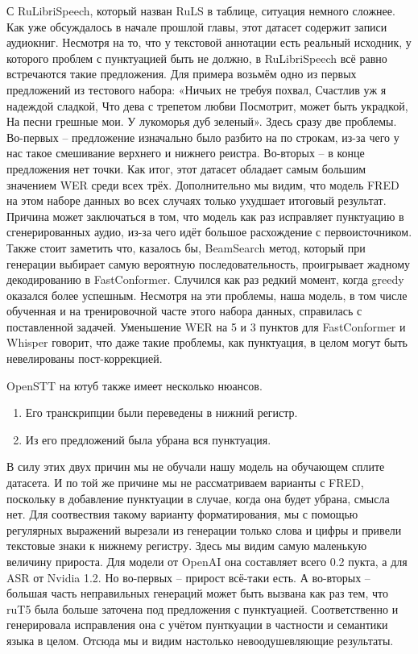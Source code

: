 С RuLibriSpeech, который назван RuLS в таблице, ситуация немного сложнее.
Как уже обсуждалось в начале прошлой главы, этот датасет содержит записи аудиокниг.
Несмотря на то, что у текстовой аннотации есть реальный исходник, у которого проблем с пунктуацией быть не должно, в RuLibriSpeech всё равно встречаются такие предложения.
Для примера возьмём одно из первых предложений из тестового набора:
«Ничьих не требуя похвал, Счастлив уж я надеждой сладкой, Что дева с трепетом любви Посмотрит, может быть украдкой, На песни грешные мои. У лукоморья дуб зеленый».
Здесь сразу две проблемы.
Во-первых -- предложение изначально было разбито на по строкам, из-за чего у нас такое смешивание верхнего и нижнего реистра.
Во-вторых -- в конце предложения нет точки.
Как итог, этот датасет обладает самым большим значением WER среди всех трёх.
Дополнительно мы видим, что модель FRED на этом наборе данных во всех случаях только ухудшает итоговый результат.
Причина может заключаться в том, что модель как раз исправляет пунктуацию в сгенерированных аудио, из-за чего идёт большое расхождение с первоисточником.
Также стоит заметить что, казалось бы, BeamSearch метод, который при генерации выбирает самую вероятную последовательность, проигрывает жадному декодированию в FastConformer.
Случился как раз редкий момент, когда greedy оказался более успешным.
Несмотря на эти проблемы, наша модель, в том числе обученная  и на тренировочной часте этого набора данных, справилась с поставленной задачей.
Уменьшение WER на 5 и 3 пунктов для FastConformer и Whisper говорит, что даже такие проблемы, как пунктуация, в целом могут быть невелированы пост-коррекцией.



OpenSTT на ютуб также имеет несколько нюансов.
\begin{enumerate}
  \item Его транскрипции были переведены в нижний регистр.
  \item Из его предложений была убрана вся пунктуация.
\end{enumerate}

В силу этих двух причин мы не обучали нашу модель на обучающем сплите датасета.
И по той же причине мы не рассматриваем варианты с FRED, поскольку в добавление пунктуации в случае, когда она будет убрана, смысла нет.
Для соотвествия такому варианту форматирования, мы с помощью регулярных выражений вырезали из генерации только слова и цифры и привели текстовые знаки к нижнему регистру.
Здесь мы видим самую маленькую величину прироста.
Для модели от OpenAI она составляет всего 0.2 пукта, а для ASR от Nvidia 1.2.
Но во-первых -- прирост всё-таки есть.
А во-вторых -- большая часть неправильных генераций может быть вызвана как раз тем, что ruT5 была больше заточена под предложения с пунктуацией.
Соответственно и генерировала исправления она с учётом пунткуации в частности и семантики языка в целом.
Отсюда мы и видим настолько невоодушевляющие результаты.

